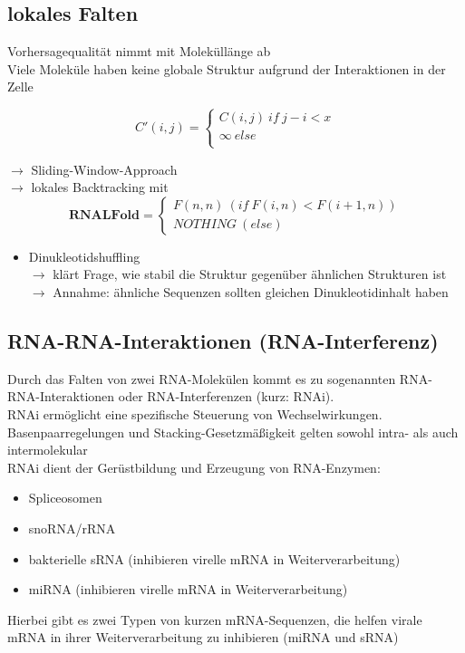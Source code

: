 \subsection{lokales Falten}

Vorhersagequalität nimmt mit Moleküllänge ab \\
Viele Moleküle haben keine globale Struktur aufgrund der Interaktionen in der Zelle

\begin{equation}
C'(i,j) =
\begin{cases}
C(i,j) \ if \ j-i<x \\
\infty \ else \\
\end{cases}
\end{equation}

$\rightarrow$ Sliding-Window-Approach \\

$\rightarrow$ lokales Backtracking mit 
\begin{equation}
\textbf{RNALFold} = 
\begin{cases}
F(n,n) \ (if \ F(i,n)<F(i+1,n)) \\
NOTHING \ (else)
\end{cases}
\end{equation}

\begin{itemize}
\item Dinukleotidshuffling \\ $\rightarrow$ klärt Frage, wie stabil die Struktur gegenüber ähnlichen Strukturen ist \\ $\rightarrow$ Annahme: ähnliche Sequenzen sollten gleichen Dinukleotidinhalt haben 
\end{itemize}

\subsection{RNA-RNA-Interaktionen (RNA-Interferenz)}
Durch das Falten von zwei RNA-Molekülen kommt es zu sogenannten RNA-RNA-Interaktionen oder RNA-Interferenzen (kurz: RNAi). \\
RNAi ermöglicht eine spezifische Steuerung von Wechselwirkungen. \\

Basenpaarregelungen und Stacking-Gesetzmäßigkeit gelten sowohl intra- als auch intermolekular \\

RNAi dient der Gerüstbildung und Erzeugung von RNA-Enzymen:
\begin{itemize}
\item Spliceosomen
\item snoRNA/rRNA
\item bakterielle sRNA (inhibieren virelle mRNA in Weiterverarbeitung)
\item miRNA (inhibieren virelle mRNA in Weiterverarbeitung)
\end{itemize}
Hierbei gibt es zwei Typen von kurzen mRNA-Sequenzen, die helfen virale mRNA in ihrer Weiterverarbeitung zu inhibieren (miRNA und sRNA) \\

